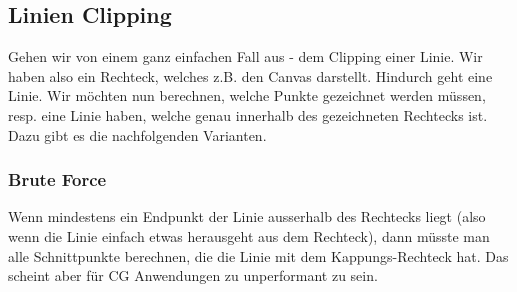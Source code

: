 \subsection{Linien Clipping}
Gehen wir von einem ganz einfachen Fall aus - dem Clipping einer Linie. Wir haben also ein Rechteck, welches z.B. den Canvas darstellt. Hindurch geht eine Linie. Wir möchten nun berechnen, welche Punkte gezeichnet werden müssen, resp. eine Linie haben, welche genau innerhalb des gezeichneten Rechtecks ist. Dazu gibt es die nachfolgenden Varianten.

\subsubsection{Brute Force}
Wenn mindestens ein Endpunkt der Linie ausserhalb des Rechtecks liegt (also wenn die Linie einfach etwas herausgeht aus dem Rechteck), dann müsste man alle Schnittpunkte berechnen, die die Linie mit dem Kappungs-Rechteck hat. Das scheint aber für CG Anwendungen zu unperformant zu sein.

